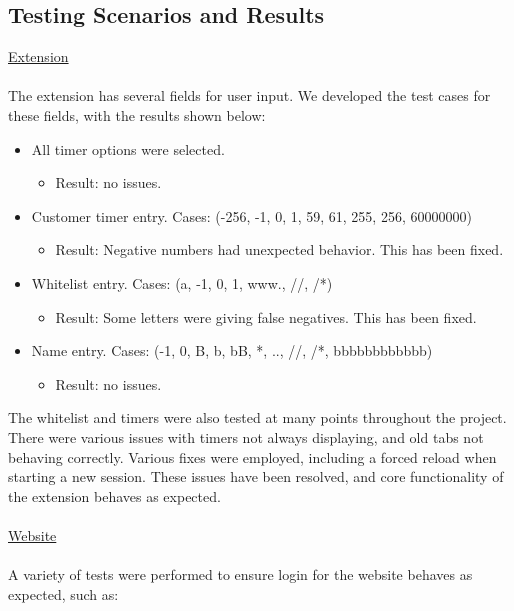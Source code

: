 \documentclass[12pt]{article}
\begin{document}
\subsection{Testing Scenarios and Results}
\noindent \underline{Extension} \\\\\indent
The extension has several fields for user input. We developed the test cases for these fields, with the results shown below:
\begin{itemize}
    \item All timer options were selected.
    \begin{itemize}
        \item Result: no issues.
    \end{itemize}
    \item Customer timer entry. Cases: (-256, -1, 0, 1, 59, 61, 255, 256, 60000000)
    \begin{itemize}
        \item Result: Negative numbers had unexpected behavior. This has been fixed.
    \end{itemize}
    \item Whitelist entry. Cases: (a, -1, 0, 1, www., //, /*)
    \begin{itemize}
        \item Result: Some letters were giving false negatives. This has been fixed.
    \end{itemize}
    \item Name entry. Cases: (-1, 0, B, b, bB, *, .., //, /*, bbbbbbbbbbbb)
    \begin{itemize}
        \item Result: no issues.
    \end{itemize}
\end{itemize}
The whitelist and timers were also tested at many points throughout the project. There were various issues with timers not always displaying, and old tabs not behaving correctly. Various fixes were employed, including a forced reload when starting a new session. These issues have been resolved, and core functionality of the extension behaves as expected.
\\\\
\noindent \underline{Website} \\\\\indent
A variety of tests were performed to ensure login for the website behaves as expected, such as:
\end{document}
